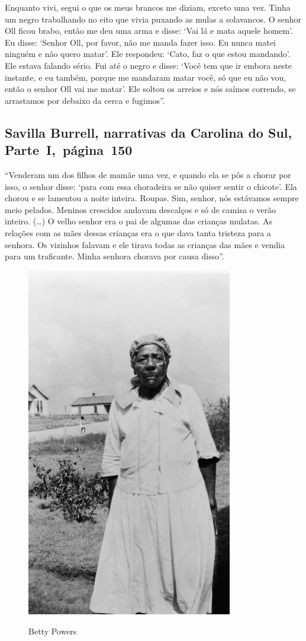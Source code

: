 Enquanto vivi, segui o que os meus brancos me diziam, exceto uma vez.
Tinha um negro trabalhando no eito que vivia puxando as mulas a
solavancos. O senhor Oll ficou brabo, então me deu uma arma e disse:
`Vai lá e mata aquele homem'. Eu disse: `Senhor Oll, por favor, não me
manda fazer isso. Eu nunca matei ninguém e não quero matar'. Ele
respondeu: `Cato, faz o que estou mandando'. Ele estava falando sério.
Fui até o negro e disse: `Você tem que ir embora neste instante, e eu
também, porque me mandaram matar você, só que eu não vou, então o senhor
Oll vai me matar'. Ele soltou os arreios e nós saímos correndo, se
arrastamos por debaixo da cerca e fugimos''.

\subsection{Savilla Burrell, narrativas da Carolina do Sul, Parte~I,~página~150} \label{ref39}

``Venderam um dos filhos de mamãe uma vez, e quando ela se pôs a chorar
por isso, o senhor disse: `para com essa choradeira se não quiser sentir
o chicote'. Ela chorou e se lamentou a noite inteira. Roupas. Sim,
senhor, nós estávamos sempre meio pelados. Meninos crescidos andavam
descalços e só de camisa o verão inteiro. (\ldots{}) O velho senhor era
o pai de algumas das crianças mulatas. As relações com as mães dessas
crianças era o que dava tanta tristeza para a senhora. Os vizinhos
falavam e ele tirava todas as crianças das mães e vendia para um
traficante. Minha senhora chorava por causa disso''.

\pagebreak
\thispagestyle{empty}
\begin{figure}[!ht]
\centering
 \includegraphics[width=90mm]{./imgs/bettypowers_recorte.jpg} \label{img11}
\caption{Betty Powers}
\end{figure}

